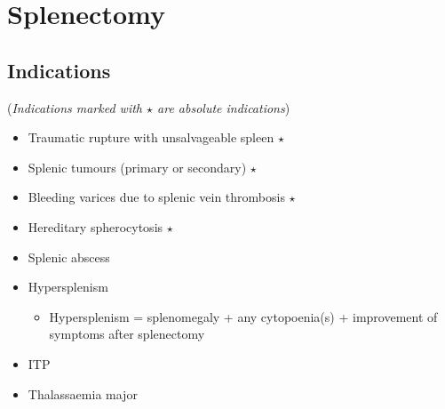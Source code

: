 \documentclass[
  12pt,
]{memoir}
\providecommand{\tightlist}{%
  \setlength{\itemsep}{0pt}\setlength{\parskip}{0pt}}
\begin{document}
\hypertarget{splenectomy}{%
\section{Splenectomy}\label{splenectomy}}

\hypertarget{indications-2}{%
\subsection{Indications}\label{indications-2}}

(\emph{Indications marked with \(\star\) are absolute indications})

\begin{itemize}
\tightlist
\item
  Traumatic rupture with unsalvageable spleen \(\star\)
\item
  Splenic tumours (primary or secondary) \(\star\)
\item
  Bleeding varices due to splenic vein thrombosis \(\star\)
\item
  Hereditary spherocytosis \(\star\)
\item
  Splenic abscess
\item
  Hypersplenism

  \begin{itemize}
  \tightlist
  \item
    Hypersplenism = splenomegaly + any cytopoenia(s) + improvement of
    symptoms after splenectomy
  \end{itemize}
\item
  ITP
\item
  Thalassaemia major
\end{itemize}

\pagebreak

\backmatter
\end{document}
